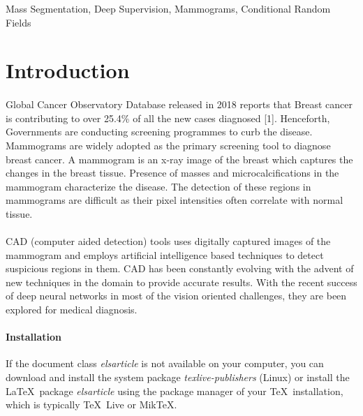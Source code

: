 \documentclass[review]{elsarticle}
\begin{document}
\begin{frontmatter}
\begin{keyword}
 Mass Segmentation, Deep Supervision, Mammograms, Conditional Random Fields
\end{keyword}

\end{frontmatter}

\linenumbers

\section{Introduction}

\paragraph{}Global Cancer Observatory Database released in 2018 reports that Breast cancer is contributing to over 25.4\% of all the new cases diagnosed [1].  Henceforth, Governments are conducting screening programmes to curb the disease. Mammograms are widely adopted as  the primary screening tool to diagnose breast cancer. A mammogram is an x-ray image of the breast which captures the changes in the breast tissue. Presence of masses and microcalcifications in the mammogram characterize the disease. The detection of these regions in mammograms are difficult as their pixel intensities often correlate with normal tissue. 

\paragraph{}CAD (computer aided detection) tools uses digitally captured images of the mammogram and employs artificial intelligence based techniques to detect suspicious regions in them. CAD has been constantly evolving with the advent of new techniques in the domain to provide accurate results. With the recent success of deep neural networks in most of the vision oriented challenges, they are been explored for medical diagnosis. 


\paragraph{Installation} If the document class \emph{elsarticle} is not available on your computer, you can download and install the system package \emph{texlive-publishers} (Linux) or install the \LaTeX\ package \emph{elsarticle} using the package manager of your \TeX\ installation, which is typically \TeX\ Live or Mik\TeX.
\end{document}
